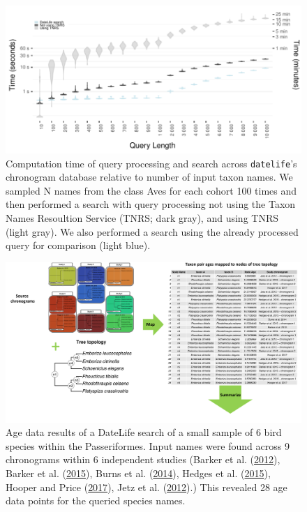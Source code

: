 \documentclass[
  english,
  man]{apa6}
\begin{document}
\begin{figure}[!h]
\includegraphics[width=1\linewidth]{../figures/fig_runtime_main.pdf}
\caption{Computation time of query processing and search across \texttt{datelife}'s chronogram database relative to number of input taxon names. We sampled N names from the class Aves for each cohort 100 times and then performed a search with query processing not using the Taxon Names Resoultion Service (TNRS; dark gray), and using TNRS (light gray). We also performed a search using the already processed query for comparison (light blue).}
\label{fig:runtime_main}
\end{figure}

\begin{figure}[!h]
\includegraphics[width=1\linewidth]{../figures/figure2/figure2-1.pdf}
\caption{Age data results of a DateLife search of a small sample of 6 bird species within the Passeriformes. Input names were found across 9 chronograms within 6 independent studies (Barker et al. (\protect\hyperlink{ref-barker2012going}{2012}), Barker et al. (\protect\hyperlink{ref-barker2015new}{2015}), Burns et al. (\protect\hyperlink{ref-burns2014phylogenetics}{2014}), Hedges et al. (\protect\hyperlink{ref-Hedges2015}{2015}), Hooper and Price (\protect\hyperlink{ref-hooper2017chromosomal}{2017}), Jetz et al. (\protect\hyperlink{ref-Jetz2012}{2012}).) This revealed 28 age data points for the queried species names.}
\label{fig:figure2-1}
\end{figure}
\end{document}
